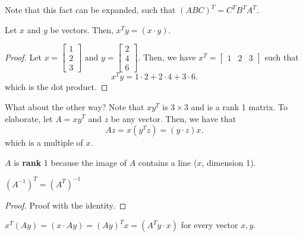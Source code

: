 Note that this fact can be expanded, such that \( (ABC)^{T}=C^{T}B^{T}A^{T}     \).

\begin{prop}
	Let \( x \) and \( y \) be vectors. Then, \( x^{T}y = (x \cdot y)  \).
\end{prop}
\begin{proof}
	Let \( x = \begin{bmatrix}
		1 \\ 2 \\ 3
	\end{bmatrix} \) and \( y = \begin{bmatrix}
		2 \\ 4 \\ 6
	\end{bmatrix} \). Then, we have \(
		x^{T} = \begin{bmatrix}
			1 & 2 & 3
		\end{bmatrix} 
	\) such that \[
		x^{T}y = 1 \cdot 2 + 2 \cdot 4 + 3 \cdot  6 
	.\] which is the dot product.
\end{proof}

What about the other way? Note that \( x y^{T}  \) is \( 3\times 3 \) and is a rank 1 matrix. To elaborate, let \(
	A = xy^{T} 
\)  and \( z \) be any vector. Then, we have that \[
	Az = x(y^{T}z )= (y \cdot z) x
.\] which is a multiple of \( x \).

\begin{definition}
	\( A \) is \textbf{rank} 1 because the image of \( A \) contains a line (\( x \), dimension 1).
\end{definition}

\begin{prop}
	\( (A^{-1} )^{T} = (A^{T} )^{-1}   \)
\end{prop}
\begin{proof}
	Proof with the identity.
\end{proof}

\begin{prop}
	\( x^{T}(Ay) = (x \cdot Ay) = (Ay)^{T}x = (A^{T}y\cdot x )  \) for every vector \( x,y \).
\end{prop}
